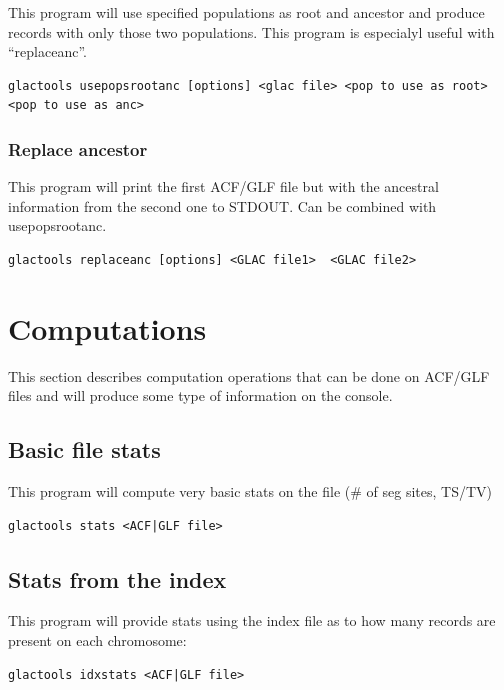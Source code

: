\documentclass[a4paper]{article}
\begin{document}
\noindent This program will use specified populations as root and ancestor and produce records with only those two populations. This program is especialyl useful with ``replaceanc''.

\begin{lstlisting}
glactools usepopsrootanc [options] <glac file> <pop to use as root> <pop to use as anc>
\end{lstlisting}


\subsubsection{Replace ancestor}

\noindent This program will print the first ACF/GLF file but with the ancestral information from the second one to STDOUT. Can be combined with usepopsrootanc.

\begin{lstlisting}
glactools replaceanc [options] <GLAC file1>  <GLAC file2>
\end{lstlisting}




\newpage

\section{Computations}

This section describes computation operations that can be done on ACF/GLF files and will produce some type of information on the console.



\subsection{Basic file stats}

 This program will compute very basic stats on the file (\# of seg sites, TS/TV)

\begin{lstlisting}
glactools stats <ACF|GLF file>
\end{lstlisting}


\subsection{Stats from the index}

\noindent This program will provide stats using the index file as to how many records are present on each chromosome:

\begin{lstlisting}
glactools idxstats <ACF|GLF file>
\end{lstlisting}
\end{document}
